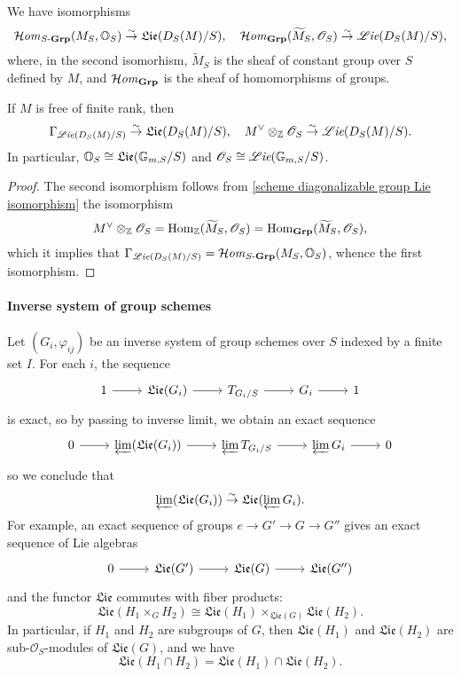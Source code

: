 \begin{proposition}\label{scheme diagonalizable group Lie isomorphism}
We have isomorphisms
\[\operatorname{\mathcal{H}\hspace*{-0.4pt}\textit{om}\hspace{0.5pt}}_{S\textup{-}\mathbf{Grp}}(M_S,\mathbb{O}_S)\stackrel{\sim}{\to}\mathfrak{Lie}(D_S(M)/S),\quad \operatorname{\mathcal{H}\hspace*{-0.4pt}\textit{om}\hspace{0.5pt}}_{\mathbf{Grp}}(\widetilde{M}_S,\mathscr{O}_S)\stackrel{\sim}{\to} \operatorname{\mathscr{L}\hspace*{-0.5pt}\textit{ie}}(D_S(M)/S),\]
where, in the second isomorhism, $\widetilde{M}_S$ is the sheaf of constant group over $S$ defined by $M$, and $\operatorname{\mathcal{H}\hspace*{-0.4pt}\textit{om}\hspace{0.5pt}}_{\mathbf{Grp}}$ is the sheaf of homomorphisms of groups.
\end{proposition}

\begin{corollary}\label{scheme diagonalizable group of free group Lie isomorphism}
If $M$ is free of finite rank, then
\[\Gamma_{\operatorname{\mathscr{L}\hspace*{-0.5pt}\textit{ie}}(D_S(M)/S)}\stackrel{\sim}{\to} \mathfrak{Lie}(D_S(M)/S),\quad M^{\vee}\otimes_{\mathbb{Z}}\mathscr{O}_S\stackrel{\sim}{\to} \operatorname{\mathscr{L}\hspace*{-0.5pt}\textit{ie}}(D_S(M)/S).\]
In particular, $\mathbb{O}_S\cong\mathfrak{Lie}(\mathbb{G}_{m,S}/S)$ and $\mathscr{O}_S\cong\operatorname{\mathscr{L}\hspace*{-0.5pt}\textit{ie}}(\mathbb{G}_{m,S}/S)$.
\end{corollary}
\begin{proof}
The second isomorphism follows from \cref{scheme diagonalizable group Lie isomorphism} the isomorphism
\[M^\vee\otimes_{\mathbb{Z}}\mathscr{O}_S=\mathrm{Hom}_{\mathbb{Z}}(\widetilde{M}_S,\mathscr{O}_S)=\mathrm{Hom}_{\mathbf{Grp}}(\widetilde{M}_S,\mathscr{O}_S),\]
which it implies that $\Gamma_{\operatorname{\mathscr{L}\hspace*{-0.5pt}\textit{ie}}(D_S(M)/S)}=\operatorname{\mathcal{H}\hspace*{-0.4pt}\textit{om}\hspace{0.5pt}}_{S\textup{-}\mathbf{Grp}}(M_S,\mathbb{O}_S)$, whence the first isomorphism.
\end{proof}

\paragraph{Inverse system of group schemes}
Let $(G_i,\varphi_{ij})$ be an inverse system of group schemes over $S$ indexed by a finite set $I$. For each $i$, the sequence
\[\begin{tikzcd}
1\ar[r]&\mathfrak{Lie}(G_i)\ar[r]&T_{G_i/S}\ar[r]&G_i\ar[r]&1
\end{tikzcd}\]
is exact, so by passing to inverse limit, we obtain an exact sequence
\[\begin{tikzcd}
0\ar[r]&\llim(\mathfrak{Lie}(G_i))\ar[r]&\llim T_{G_i/S}\ar[r]&\llim G_i\ar[r]&0
\end{tikzcd}\]
so we conclude that
\[\varprojlim(\mathfrak{Lie}(G_i))\stackrel{\sim}{\to}\mathfrak{Lie}(\varprojlim G_i).\]
For example, an exact sequence of groups $e\to G'\to G\to G''$ gives an exact sequence of Lie algebras
\[\begin{tikzcd}
0\ar[r]&\mathfrak{Lie}(G')\ar[r]&\mathfrak{Lie}(G)\ar[r]&\mathfrak{Lie}(G'')
\end{tikzcd}\]
and the functor $\mathfrak{Lie}$ commutes with fiber products:
\[\mathfrak{Lie}(H_1\times_GH_2)\cong\mathfrak{Lie}(H_1)\times_{\mathfrak{Lie}(G)}\mathfrak{Lie}(H_2).\]
In particular, if $H_1$ and $H_2$ are subgroups of $G$, then $\mathfrak{Lie}(H_1)$ and $\mathfrak{Lie}(H_2)$ are sub-$\mathscr{O}_S$-modules of $\mathfrak{Lie}(G)$, and we have
\[\mathfrak{Lie}(H_1\cap H_2)=\mathfrak{Lie}(H_1)\cap\mathfrak{Lie}(H_2).\]

